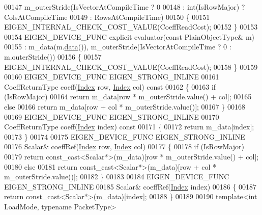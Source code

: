 \begin{DoxyCode}
00147       m\_outerStride(IsVectorAtCompileTime  ? 0 
00148                                            : \textcolor{keywordtype}{int}(IsRowMajor) ? ColsAtCompileTime 
00149                                            : RowsAtCompileTime)
00150   \{
00151     EIGEN\_INTERNAL\_CHECK\_COST\_VALUE(CoeffReadCost);
00152   \}
00153   
00154   EIGEN\_DEVICE\_FUNC \textcolor{keyword}{explicit} evaluator(\textcolor{keyword}{const} PlainObjectType& m)
00155     : m\_data(m.\hyperlink{class_eigen_1_1_plain_object_base_ac25699535374b1854cf8494e44ad31b2}{data}()), m\_outerStride(IsVectorAtCompileTime ? 0 : m.outerStride()) 
00156   \{
00157     EIGEN\_INTERNAL\_CHECK\_COST\_VALUE(CoeffReadCost);
00158   \}
00159 
00160   EIGEN\_DEVICE\_FUNC EIGEN\_STRONG\_INLINE
00161   CoeffReturnType coeff(\hyperlink{namespace_eigen_a62e77e0933482dafde8fe197d9a2cfde}{Index} row, \hyperlink{namespace_eigen_a62e77e0933482dafde8fe197d9a2cfde}{Index} col)\textcolor{keyword}{ const}
00162 \textcolor{keyword}{  }\{
00163     \textcolor{keywordflow}{if} (IsRowMajor)
00164       \textcolor{keywordflow}{return} m\_data[row * m\_outerStride.value() + col];
00165     \textcolor{keywordflow}{else}
00166       \textcolor{keywordflow}{return} m\_data[row + col * m\_outerStride.value()];
00167   \}
00168 
00169   EIGEN\_DEVICE\_FUNC EIGEN\_STRONG\_INLINE
00170   CoeffReturnType coeff(\hyperlink{namespace_eigen_a62e77e0933482dafde8fe197d9a2cfde}{Index} index)\textcolor{keyword}{ const}
00171 \textcolor{keyword}{  }\{
00172     \textcolor{keywordflow}{return} m\_data[index];
00173   \}
00174 
00175   EIGEN\_DEVICE\_FUNC EIGEN\_STRONG\_INLINE
00176   Scalar& coeffRef(\hyperlink{namespace_eigen_a62e77e0933482dafde8fe197d9a2cfde}{Index} row, \hyperlink{namespace_eigen_a62e77e0933482dafde8fe197d9a2cfde}{Index} col)
00177   \{
00178     \textcolor{keywordflow}{if} (IsRowMajor)
00179       \textcolor{keywordflow}{return} \textcolor{keyword}{const\_cast<}Scalar*\textcolor{keyword}{>}(m\_data)[row * m\_outerStride.value() + col];
00180     \textcolor{keywordflow}{else}
00181       \textcolor{keywordflow}{return} \textcolor{keyword}{const\_cast<}Scalar*\textcolor{keyword}{>}(m\_data)[row + col * m\_outerStride.value()];
00182   \}
00183 
00184   EIGEN\_DEVICE\_FUNC EIGEN\_STRONG\_INLINE
00185   Scalar& coeffRef(\hyperlink{namespace_eigen_a62e77e0933482dafde8fe197d9a2cfde}{Index} index)
00186   \{
00187     \textcolor{keywordflow}{return} \textcolor{keyword}{const\_cast<}Scalar*\textcolor{keyword}{>}(m\_data)[index];
00188   \}
00189 
00190   \textcolor{keyword}{template}<\textcolor{keywordtype}{int} LoadMode, \textcolor{keyword}{typename} PacketType>

\end{DoxyCode}
